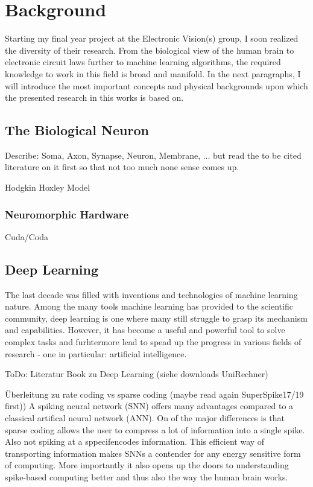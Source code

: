 \chapter{Background}
Starting my final year project at the Electronic Vision(s) group, I soon realized the diversity of their research. From the biological view of the human brain to electronic circuit laws further to machine learning algorithms, the required knowledge to work in this field is broad and manifold. In the next paragraphs, I will introduce the most important concepts and physical backgrounds upon which the presented research in this works is based on.

\section{The Biological Neuron}

Describe: Soma, Axon, Synapse, Neuron, Membrane, ... but read the to be cited literature on it first so that not too much none sense comes up.

Hodgkin Hoxley Model


\subsection{Neuromorphic Hardware}
Cuda/Coda


\section{Deep Learning}

The last decade was filled with inventions and technologies of machine learning nature. Among the many tools machine learning has provided to the scientific community, deep learning is one where many still struggle to grasp its mechanism and capabilities. However, it has become a useful and powerful tool to solve complex tasks and furhtermore lead to spead up the progress in various fields of research - one in particular: artificial intelligence.

ToDo: Literatur Book zu Deep Learning (siehe downloads UniRechner)

Überleitung zu rate coding vs sparse coding (maybe read again SuperSpike17/19 first))
A spiking neural network (SNN) offers many advantages compared to a classical artifical neural network (ANN). On of the major differences is that sparse coding allows the user to compress a lot of information into a single spike. Also not spiking at a sppecifencodes information.  This efficient way of transporting information makes SNNs a contender for any energy sensitive form of computing. More importantly it also opens up the doors to understanding spike-based computing better and thus also the way the human brain works.
